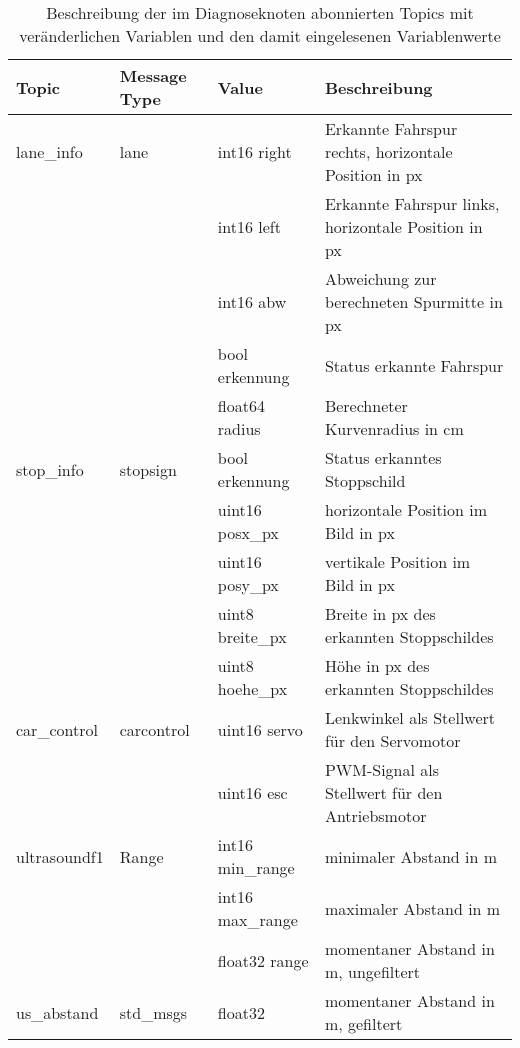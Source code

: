 \begin{table}[!htb]
	\centering
	\caption{Beschreibung der im Diagnoseknoten abonnierten Topics mit veränderlichen Variablen und den damit eingelesenen Variablenwerte}
	\footnotesize
	\renewcommand{\arraystretch}{1.3}
	\begin{tabular}{l l l p{6.5cm}}
		\toprule
		Topic        & Message Type & Value              & Beschreibung                                         \\ \midrule
		lane\_info   & lane         & int16 right        & Erkannte Fahrspur rechts, \newline horizontale Position in px \\
		             &              & int16 left         & Erkannte Fahrspur links, \newline horizontale Position in px  \\
		             &              & int16 abw          & Abweichung zur berechneten Spurmitte in px           \\
		             &              & bool erkennung     & Status erkannte Fahrspur                             \\
		             &              & float64 radius     & Berechneter Kurvenradius in cm                       \\ \midrule
		stop\_info   & stopsign     & bool erkennung     & Status erkanntes Stoppschild                         \\
		             &              & uint16 posx\_px    & horizontale Position im Bild in px                   \\
		             &              & uint16 posy\_px    & vertikale Position im Bild in px                     \\
		             &              & uint8 breite\_px   & Breite in px des erkannten Stoppschildes             \\
		             &              & uint8 hoehe\_px    & Höhe in px des erkannten Stoppschildes               \\ \midrule
		car\_control & carcontrol   & uint16 servo       & Lenkwinkel als Stellwert für den Servomotor     \\
		             &              & uint16 esc         & PWM-Signal als Stellwert für den Antriebsmotor         \\ \midrule
		ultrasoundf1 & Range        & int16 min\_range & minimaler Abstand in m                               \\
		             &              & int16 max\_range & maximaler Abstand in m                               \\
		             &              & float32 range      & momentaner Abstand in m, ungefiltert                               \\
		             \midrule
 		us\_abstand & std\_msgs		& float32 			 &  momentaner Abstand in m, gefiltert 								\\
		              \bottomrule
	\end{tabular}
	\label{tab:ROSmessagesDynamischBeschreibung}
\end{table}

